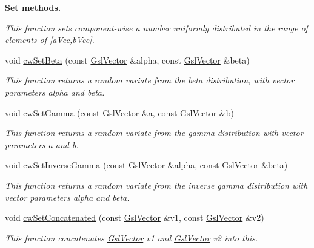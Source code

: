 \begin{Indent}{\bf Set methods.}
\begin{DoxyCompactItemize}
\begin{DoxyCompactList}\small\item\em This function sets component-\/wise a number uniformly distributed in the range of elements of \mbox{[}a\-Vec,b\-Vec\mbox{]}. \end{DoxyCompactList}\item 
void \hyperlink{class_q_u_e_s_o_1_1_gsl_vector_aa04f6e813bb7533f50b85eba3da269d5}{cw\-Set\-Beta} (const \hyperlink{class_q_u_e_s_o_1_1_gsl_vector}{Gsl\-Vector} \&alpha, const \hyperlink{class_q_u_e_s_o_1_1_gsl_vector}{Gsl\-Vector} \&beta)
\begin{DoxyCompactList}\small\item\em This function returns a random variate from the beta distribution, with vector parameters alpha and beta. \end{DoxyCompactList}\item 
void \hyperlink{class_q_u_e_s_o_1_1_gsl_vector_ac8f6033638a8d99aa28e68cfe8ead8d3}{cw\-Set\-Gamma} (const \hyperlink{class_q_u_e_s_o_1_1_gsl_vector}{Gsl\-Vector} \&a, const \hyperlink{class_q_u_e_s_o_1_1_gsl_vector}{Gsl\-Vector} \&b)
\begin{DoxyCompactList}\small\item\em This function returns a random variate from the gamma distribution with vector parameters a and b. \end{DoxyCompactList}\item 
void \hyperlink{class_q_u_e_s_o_1_1_gsl_vector_a7609032ec133374fefeeb3aad12df093}{cw\-Set\-Inverse\-Gamma} (const \hyperlink{class_q_u_e_s_o_1_1_gsl_vector}{Gsl\-Vector} \&alpha, const \hyperlink{class_q_u_e_s_o_1_1_gsl_vector}{Gsl\-Vector} \&beta)
\begin{DoxyCompactList}\small\item\em This function returns a random variate from the inverse gamma distribution with vector parameters alpha and beta. \end{DoxyCompactList}\item 
void \hyperlink{class_q_u_e_s_o_1_1_gsl_vector_a6bd9c99a7de9a9203f9f12d36c1e24b6}{cw\-Set\-Concatenated} (const \hyperlink{class_q_u_e_s_o_1_1_gsl_vector}{Gsl\-Vector} \&v1, const \hyperlink{class_q_u_e_s_o_1_1_gsl_vector}{Gsl\-Vector} \&v2)
\begin{DoxyCompactList}\small\item\em This function concatenates \hyperlink{class_q_u_e_s_o_1_1_gsl_vector}{Gsl\-Vector} v1 and \hyperlink{class_q_u_e_s_o_1_1_gsl_vector}{Gsl\-Vector} v2 into {\ttfamily this}. \end{DoxyCompactList}\item 

\end{DoxyCompactItemize}
\end{Indent}
